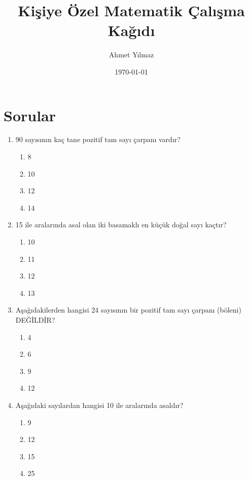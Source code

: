 \documentclass[12pt,a4paper]{article}
\title{\textbf{Kişiye Özel Matematik Çalışma Kağıdı}}
\author{Ahmet Yılmaz}
\date{\today}
\begin{document}
\maketitle

\section*{Sorular}
\begin{enumerate}
\end{enumerate}
\begin{multicols}{2}
\begin{enumerate}[resume]
  \item 90 sayısının kaç tane pozitif tam sayı çarpanı vardır?
  \begin{enumerate}
    \item 8
    \item 10
    \item 12
    \item 14
  \end{enumerate}
  \vspace{1cm}
  \item 15 ile aralarında asal olan iki basamaklı en küçük doğal sayı kaçtır?
  \begin{enumerate}
    \item 10
    \item 11
    \item 12
    \item 13
  \end{enumerate}
  \vspace{1cm}
  \item Aşağıdakilerden hangisi 24 sayısının bir pozitif tam sayı çarpanı (böleni) DEĞİLDİR?
  \begin{enumerate}
    \item 4
    \item 6
    \item 9
    \item 12
  \end{enumerate}
  \vspace{1cm}
  \item Aşağıdaki sayılardan hangisi 10 ile aralarında asaldır?
  \begin{enumerate}
    \item 9
    \item 12
    \item 15
    \item 25
  \end{enumerate}
  \vspace{1cm}
\end{enumerate}
\end{multicols}
\newpage
\end{document}
